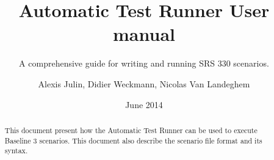 \documentclass{template/openetcs}
\begin{document}
\frontmatter
{}





\title{Automatic Test Runner User manual}

\subtitle{A comprehensive guide for writing and running SRS 330 scenarios.}

\date{June 2014}








\author{Alexis Julin, Didier Weckmann, Nicolas Van Landeghem}





\begin{abstract}
  This document present how the Automatic Test Runner can be used to execute Baseline 3 scenarios. This document also describe the scenario file format and its syntax.
\end{abstract}

\maketitle

\end{document}
